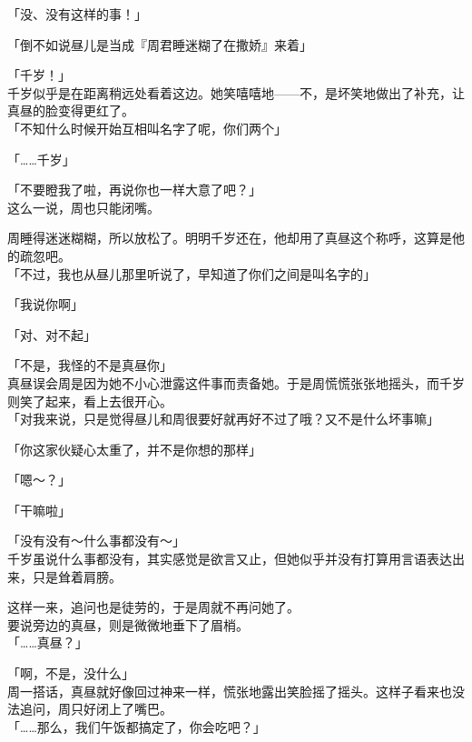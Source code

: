 「没、没有这样的事！」

「倒不如说昼儿是当成『周君睡迷糊了在撒娇』来着」

「千岁！」\\

千岁似乎是在距离稍远处看着这边。她笑嘻嘻地——不，是坏笑地做出了补充，让真昼的脸变得更红了。\\

「不知什么时候开始互相叫名字了呢，你们两个」

「……千岁」

「不要瞪我了啦，再说你也一样大意了吧？」\\

这么一说，周也只能闭嘴。

周睡得迷迷糊糊，所以放松了。明明千岁还在，他却用了真昼这个称呼，这算是他的疏忽吧。\\

「不过，我也从昼儿那里听说了，早知道了你们之间是叫名字的」

「我说你啊」

「对、对不起」

「不是，我怪的不是真昼你」\\

真昼误会周是因为她不小心泄露这件事而责备她。于是周慌慌张张地摇头，而千岁则笑了起来，看上去很开心。\\

「对我来说，只是觉得昼儿和周很要好就再好不过了哦？又不是什么坏事嘛」

「你这家伙疑心太重了，并不是你想的那样」

「嗯～？」

「干嘛啦」

「没有没有～什么事都没有～」\\

千岁虽说什么事都没有，其实感觉是欲言又止，但她似乎并没有打算用言语表达出来，只是耸着肩膀。

这样一来，追问也是徒劳的，于是周就不再问她了。\\

要说旁边的真昼，则是微微地垂下了眉梢。\\

「……真昼？」

「啊，不是，没什么」\\

周一搭话，真昼就好像回过神来一样，慌张地露出笑脸摇了摇头。这样子看来也没法追问，周只好闭上了嘴巴。\\

「……那么，我们午饭都搞定了，你会吃吧？」

